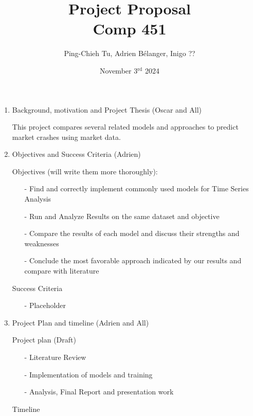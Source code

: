 \documentclass[12pt, letterpaper]{article}
\title{
  Project Proposal \\
  \Large Comp 451}
\author{Ping-Chieh Tu, Adrien Bélanger, Inigo ??}
\date{November 3$^{\text{rd}}$ 2024}
\begin{document}
\maketitle 

\begin{enumerate}
    \item Background, motivation and Project Thesis (Oscar and All)
    
    This project compares several related models and approaches to predict market crashes using market data.
    
    \item Objectives and Success Criteria (Adrien)
    
        Objectives (will write them more thoroughly):
        \begin{itemize}
            \item [-] Find and correctly implement commonly used models for Time Series Analysis
            \item[-] Run and Analyze Results on the same dataset and objective
            \item[-] Compare the results of each model and discuss their strengths and weaknesses
            \item[-]  Conclude the most favorable approach indicated by our results and compare with literature
        \end{itemize} 
        Success Criteria
        \begin{itemize}
            \item [-] Placeholder
        \end{itemize}
        
    \item Project Plan and timeline (Adrien and All)
        
        Project plan (Draft)
        \begin{itemize}
            \item [-] Literature Review
            \item [-] Implementation of models and training
            \item [-] Analysis, Final Report and presentation work
        \end{itemize}
    
        Timeline
        
\end{enumerate}
\end{document}
